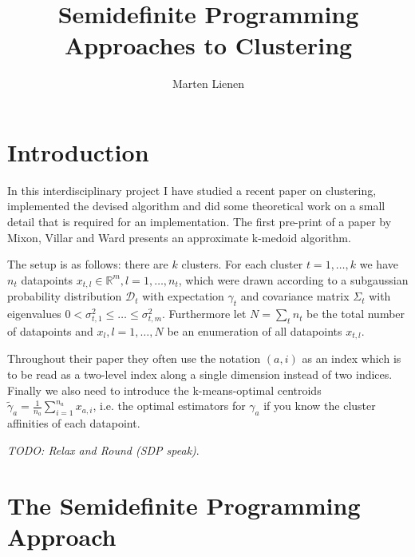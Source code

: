 \documentclass[10pt,a4paper]{article}
\title{Semidefinite Programming Approaches to Clustering}
\author{Marten Lienen}
\date{}
\begin{document}
\maketitle

\section{Introduction}

In this interdisciplinary project I have studied a recent paper on clustering, implemented the devised algorithm and did some theoretical work on a small detail that is required for an implementation.
The first pre-print \cite{sdp} of a paper by Mixon, Villar and Ward presents an approximate k-medoid algorithm.

The setup is as follows: there are $k$ clusters.
For each cluster $t = 1, \dots, k$ we have $n_{t}$ datapoints $x_{t, l} \in \mathbb{R}^{m}, l = 1, \dots, n_{t}$, which were drawn according to a subgaussian probability distribution $\mathcal{D}_{t}$ with expectation $\gamma_{t}$ and covariance matrix $\Sigma_{t}$ with eigenvalues $0 < \sigma_{t, 1}^{2} \le \dots \le \sigma_{t, m}^{2}$.
Furthermore let $N = \sum_{t} n_{t}$ be the total number of datapoints and $x_{l}, l = 1, \dots, N$ be an enumeration of all datapoints $x_{t, l}$.

Throughout their paper they often use the notation $(a, i)$ as an index which is to be read as a two-level index along a single dimension instead of two indices.
Finally we also need to introduce the k-means-optimal centroids $\tilde{\gamma}_{a} = \frac{1}{n_{a}} \sum_{i = 1}^{n_{a}} x_{a, i}$, i.e. the optimal estimators for $\gamma_{a}$ if you know the cluster affinities of each datapoint.

\emph{TODO: Relax and Round (SDP speak)}.

\section{The Semidefinite Programming Approach}
\end{document}
